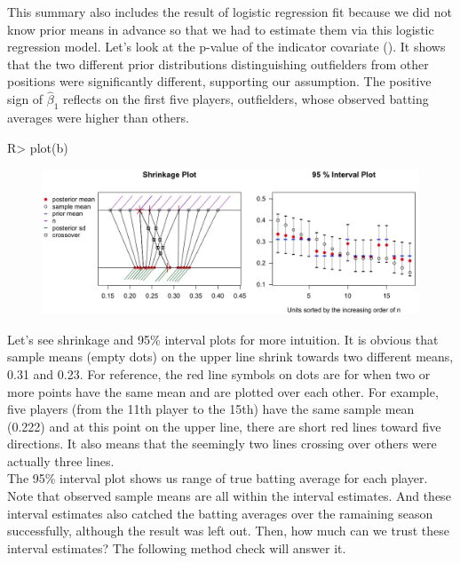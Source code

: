 \documentclass[article]{jss}
\begin{document}
This summary also includes the result of logistic regression fit because we did not know prior means in advance so that we had to estimate them via this logistic regression model. Let's look at the p-value of the indicator covariate (). It shows that the two different prior distributions distinguishing outfielders from other positions were significantly different, supporting our assumption. The positive sign of $\hat{\beta}_{1}$ reflects on the first five players, outfielders, whose observed batting averages were higher than others.
\\
\begin{CodeChunk}
\begin{CodeInput}
R> plot(b)
\end{CodeInput}
\end{CodeChunk}
\begin{figure}[h]
\begin{center}
\includegraphics[scale=0.3]{baseball1.png}
\end{center}
\end{figure}

Let's see shrinkage and 95\% interval plots for more intuition. It is obvious that sample means (empty dots) on the upper line shrink towards two different means, 0.31 and 0.23. For reference, the red line symbols on dots are for when two or more points have the same mean and are plotted over each other. For example, five players (from the 11th player to the 15th) have the same sample mean (0.222) and at this point on the upper line, there are short red lines toward five directions. It also means that the seemingly two lines crossing over others were actually three lines. 
\\

The 95\% interval plot shows us range of true batting average for each player. Note that observed sample means are all within the interval estimates. And these interval estimates also catched the batting averages over the ramaining season successfully, although the result was left out. Then, how much can we trust these interval estimates? The following method check will answer it. 
\end{document}
